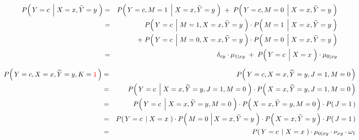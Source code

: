 \begin{enumerate}
\begin{eqnarray*}
P\!\left(\,Y=c \;\left\vert\; X=x,\widetilde{Y}=y\right.\,\right)
&=&
	P\!\left(\, Y=c,M=1 \;\left\vert\; X=x,\widetilde{Y}=y\right.\,\right)
	\;+\;
	P\!\left(\, Y=c,M=0 \;\left\vert\; X=x,\widetilde{Y}=y\right.\,\right)
\\
&=&
	{\color{white}+}\;
	P\!\left(\, Y=c \;\left\vert\; M=1, X=x,\widetilde{Y}=y\right.\,\right)
	\cdot
	P\!\left(\, M=1 \;\left\vert\; X=x,\widetilde{Y}=y\right.\,\right)
\\
&&
	+\;
	P\!\left(\, Y=c \;\left\vert\; M=0,X=x,\widetilde{Y}=y\right.\,\right)
	\cdot
	P\!\left(\, M=0 \;\left\vert\; X=x,\widetilde{Y}=y\right.\,\right)
\\
&=&
	{\color{white}+}\;
	\delta_{cy}
	\cdot
	\mu_{1 \vert x y} %
	\;+\;
	P\!\left(\, Y=c \;\left\vert\; \overset{{\color{white}.}}{X}=x \right.\,\right)
	\cdot
	\mu_{0 \vert x y} %
\end{eqnarray*}

\begin{eqnarray*}
P\!\left(\,Y=c,X=x,\widetilde{Y}=y,K={\color{red}1}\,\right)
&=&
	P\!\left(\,Y=c,X=x,\widetilde{Y}=y,J=1,M=0\,\right)
\\
&=&
	P\!\left(\,Y=c \;\left\vert\; X=x,\widetilde{Y}=y,J=1,M=0\right.\,\right)
	\cdot
	P\!\left(\,X=x,\widetilde{Y}=y,J=1,M=0\,\right)
\\
&=&
	P\!\left(\,Y=c \;\left\vert\; X=x,\widetilde{Y}=y,M=0\right.\,\right)
	\cdot
	P\!\left(\,X=x,\widetilde{Y}=y,M=0\,\right)
	\cdot
	P\!\left(\,J=1\,\right)
\\
&=&
	P\!\left(\,Y=c \;\left\vert\; X=x\right.\,\right)
	\cdot
	P\!\left(\,M=0 \,\left\vert\, X=x,\widetilde{Y}=y \right.\,\right) 
	\cdot
	P\!\left(\,X=x,\widetilde{Y}=y\,\right) 
	\cdot
	P\!\left(\,J=1\,\right)
\\
&=&
	P\!\left(\,Y=c \;\left\vert\; X=x\right.\,\right)
	\cdot
	\mu_{0 \vert xy} %
	\cdot
	\nu_{xy} %
	\cdot
	\omega_{1} %
\end{eqnarray*}


\end{enumerate}
